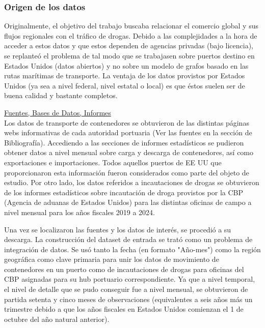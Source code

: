 \documentclass[12pt]{article}
\begin{document}
		\subsubsection{\label{data origin}Origen de los datos}
		Originalmente, el objetivo del trabajo buscaba relacionar el comercio global y sus flujos regionales con el tráfico de drogas. Debido a las complejidades a la hora de acceder a estos datos y que estos dependen de agencias privadas (bajo licencia), se replanteó el problema de tal modo que se trabajasen sobre puertos destino en Estados Unidos (datos abiertos) y no sobre un modelo de grafos basado en las rutas marítimas de transporte. La ventaja de los datos provistos por Estados Unidos (ya sea a nivel federal, nivel estatal o local) es que éstos suelen ser de buena calidad y bastante completos.
		
		\underline{Fuentes, Bases de Datos, Informes}\\
		Los datos de transporte de contenedores se obtuvieron de las distintas páginas webs informativas de cada autoridad portuaria (Ver las fuentes en la sección de Bibliografía). Accediendo a las secciones de informes estadísticos se pudieron obtener datos a nivel mensual sobre carga y descarga de contenedores, así como exportaciones e importaciones. Todos aquellos puertos de EE UU que proporcionaron esta información fueron considerados como parte del objeto de estudio. Por otro lado, los datos referidos a incautaciones de drogas se obtuvieron de los informes estadísticos sobre incautación de droga provistos por la CBP (Agencia de aduanas de Estados Unidos) para las distintas oficinas de campo a nivel mensual para los años fiscales 2019 a 2024.
		
		
		Una vez se localizaron las fuentes y los datos de interés, se procedió a su descarga. La construcción del dataset de entrada se trató como un problema de integración de datos. Se usó tanto la fecha (en formato "Año-mes") como la región geográfica como clave primaria para unir los datos de movimiento de contenedores en un puerto como de incautaciones de drogas para oficinas del CBP asignadas para su hub portuario correspondiente. Ya que a nivel temporal, el nivel de detalle que se pudo conseguir fue a nivel mensual, se obtuvieron de partida setenta y cinco meses de observaciones (equivalentes a seis años más un trimestre debido a que los años fiscales en Estados Unidos comienzan el 1 de octubre del año natural anterior).
		
\end{document}
